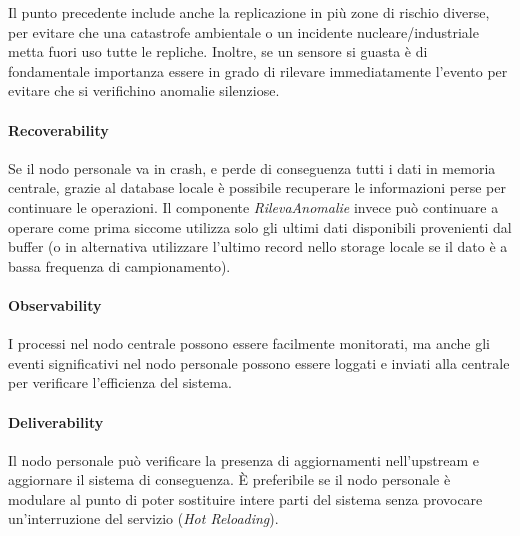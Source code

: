 \documentclass[a4paper,11pt,oneside, table]{article}
\begin{document}
Il punto precedente include anche la replicazione in pi\`u zone di rischio diverse, per evitare che una catastrofe ambientale o un incidente nucleare/industriale metta fuori uso tutte le repliche.
Inoltre, se un sensore si guasta \`e di fondamentale importanza essere in grado di rilevare immediatamente l'evento per evitare che si verifichino anomalie silenziose.

\paragraph{Recoverability}

Se il nodo personale va in crash, e perde di conseguenza tutti i dati in memoria centrale, grazie al database locale \`e possibile recuperare le informazioni perse per continuare le operazioni. Il componente \textit{RilevaAnomalie} invece pu\`o continuare a operare come prima siccome utilizza solo gli ultimi dati disponibili provenienti dal buffer (o in alternativa utilizzare l'ultimo record nello storage locale se il dato \`e a bassa frequenza di campionamento).

\paragraph{Observability}

I processi nel nodo centrale possono essere facilmente monitorati, ma anche gli eventi significativi nel nodo personale possono essere loggati e inviati alla centrale per verificare l'efficienza del sistema.

\paragraph{Deliverability}

Il nodo personale pu\`o verificare la presenza di aggiornamenti nell'upstream e aggiornare il sistema di conseguenza. \`E preferibile se il nodo personale \`e modulare al punto di poter sostituire intere parti del sistema senza provocare un'interruzione del servizio (\textit{Hot Reloading}).
\end{document}
